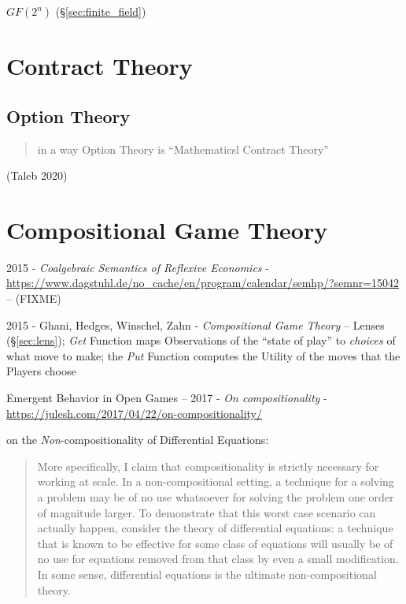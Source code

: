 $GF(2^n)$ (\S\ref{sec:finite_field})



\section{Contract Theory}\label{sec:contract_theory}

\subsection{Option Theory}\label{sec:option_theory}

\begin{quote}
  in a way Option Theory is ``Mathematicsl Contract Theory''
\end{quote}
(Taleb 2020)



\section{Compositional Game Theory}\label{sec:compositional_game_theory}

2015 - \emph{Coalgebraic Semantics of Reflexive Economics} -
\url{https://www.dagstuhl.de/no_cache/en/program/calendar/semhp/?semnr=15042} --
(FIXME)

2015 - Ghani, Hedges, Winschel, Zahn - \emph{Compositional Game Theory}
-- Lenses (\S\ref{sec:lens}); \emph{Get} Function maps Observations of the
``state of play'' to \emph{choices} of what move to make; the \emph{Put}
Function computes the Utility of the moves that the Players choose

Emergent Behavior in Open Games --
2017 - \emph{On compositionality} -
\url{https://julesh.com/2017/04/22/on-compositionality/}

on the \emph{Non}-compositionality of Differential Equations:
\begin{quote}
  More specifically, I claim that compositionality is strictly necessary
  for working at scale. In a non-compositional setting, a technique for a
  solving a problem may be of no use whatsoever for solving the problem one
  order of magnitude larger. To demonstrate that this worst case scenario can
  actually happen, consider the theory of differential equations: a technique
  that is known to be effective for some class of equations will usually be of
  no use for equations removed from that class by even a small modification. In
  some sense, differential equations is the ultimate non-compositional theory.
\end{quote}

